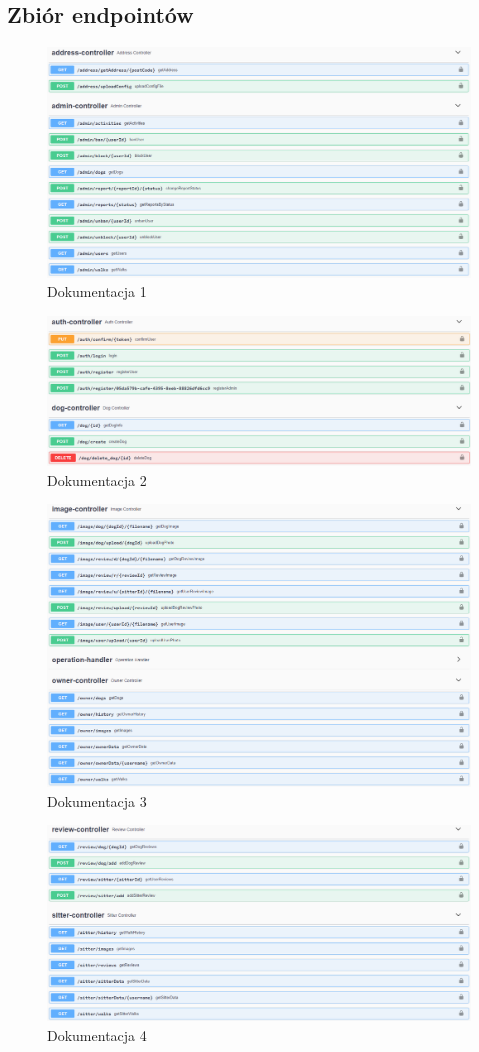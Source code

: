 \subsection{Zbiór endpointów}
\begin{figure}[H]
    \centering
    \includegraphics[width=0.7\linewidth]{rysunki/sw-1.PNG}
    \caption{Dokumentacja 1}
    \label{fig:swagger-1}
\end{figure}  
\begin{figure}[H]
    \centering
    \includegraphics[width=0.7\linewidth]{rysunki/sw-2.PNG}
    \caption{Dokumentacja 2}
    \label{fig:swagger-2}
\end{figure}  
\begin{figure}[H]
    \centering
    \includegraphics[width=0.7\linewidth]{rysunki/sw-3.PNG}
    \caption{Dokumentacja 3}
    \label{fig:swagger-3}
\end{figure}  
\begin{figure}[H]
    \centering
    \includegraphics[width=0.7\linewidth]{rysunki/sw-4.PNG}
    \caption{Dokumentacja 4}
    \label{fig:swagger-4}
\end{figure}  
